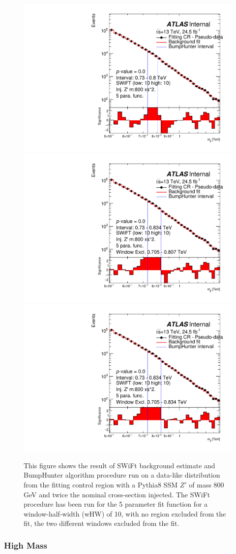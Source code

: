 \begin{figure}[!htb]
\captionsetup[subfigure]{aboveskip=0pt,justification=centering}
\centering
{} {
  \includegraphics[width=0.3\linewidth, angle=0]{figs/Dibjet/LowMass/FitStudy/bhFit_corrFitCR_dataLike_5para_low10_high10_inj_Zprimebb800_xsFactor2.pdf}
}
 {
  \includegraphics[width=0.3\linewidth, angle=0]{figs/Dibjet/LowMass/FitStudy/bhFit_corrFitCR_dataLike_5para_low10_high10_inj_Zprimebb800_xsFactor2_removedWindow.pdf}
}
 {
  \includegraphics[width=0.3\linewidth, angle=0]{figs/Dibjet/LowMass/FitStudy/bhFit_corrFitCR_dataLike_5para_low10_high10_inj_Zprimebb800_xsFactor2_removedWindow2.pdf}
}
\vspace{10pt}
\caption{\label{fig:bhFit_lm_corrFitCR_dataLike_inj_Zprimebb800_xsFactor2_wHW10}
  This figure shows the result of SWiFt background estimate and {\sc BumpHunter} algorithm procedure run on a data-like distribution
  from the fitting control region with a Pythia8 SSM $Z'$ of mass 800 GeV and twice the nominal cross-section injected.
  The SWiFt procedure has been run for the 5 parameter fit function for a window-half-width (wHW) of 10, with no region excluded from the fit, the two different windows excluded from the fit.}
\end{figure}

\subsubsection{High Mass}
\label{sec:highmass_signalInj}

